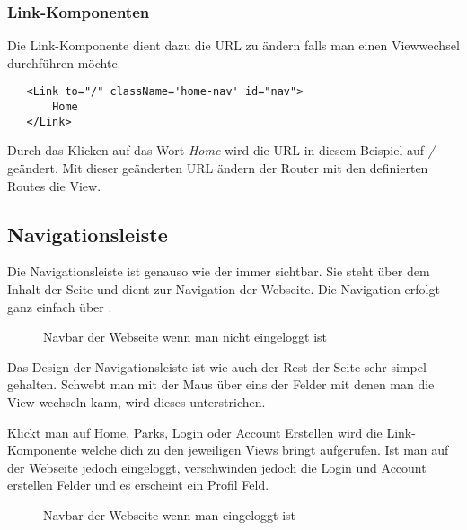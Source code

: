 \subsubsection{Link-Komponenten}
\label{React-Links}
Die Link-Komponente dient dazu die URL zu ändern falls man einen Viewwechsel durchführen möchte.
\begin{lstlisting}
   <Link to="/" className='home-nav' id="nav">
       Home
   </Link>
\end{lstlisting}
Durch das Klicken auf das Wort \textit{Home} wird die URL in diesem Beispiel auf \textit{/} geändert.
Mit dieser geänderten URL ändern der Router mit den definierten Routes die View.

\subsection{Navigationsleiste}
\label{nav}

Die Navigationsleiste ist genauso wie der  immer sichtbar. Sie steht über dem Inhalt der Seite und 
dient zur Navigation der Webseite. Die Navigation erfolgt ganz einfach über .

\begin{figure}[H]
  \begin{center}
    \caption{Navbar der Webseite wenn man nicht eingeloggt ist}
  \end{center}
\end{figure}

Das Design der Navigationsleiste ist wie auch der Rest der Seite sehr simpel gehalten. Schwebt man 
mit der Maus über eins der Felder mit denen man die View wechseln kann, wird dieses unterstrichen.


Klickt man auf Home, Parks, Login oder Account Erstellen wird die Link-Komponente welche dich zu den 
jeweiligen Views bringt aufgerufen. Ist man auf der Webseite jedoch eingeloggt, verschwinden jedoch 
die Login und Account erstellen Felder und es erscheint ein Profil Feld.

\begin{figure}[H]
    \begin{center}
      \caption{Navbar der Webseite wenn man eingeloggt ist}
    \end{center}
\end{figure}

\pagebreak

